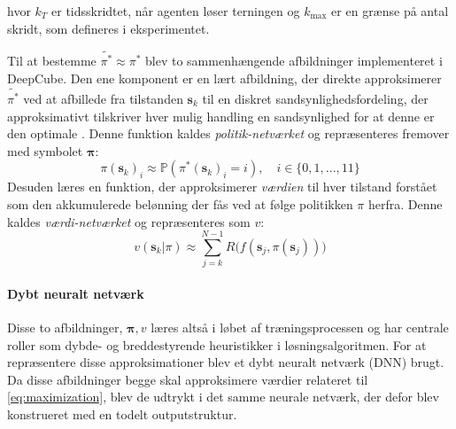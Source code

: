 \documentclass[../main.tex]{subfiles}
\begin{document}
hvor \(k_T\) er tidsskridtet, når agenten løser terningen og \(k_{\text{max}}\) er en grænse på antal skridt,  som defineres i eksperimentet. 

Til at bestemme \(\widetilde {\pi ^*} \approx 	\pi^*\) blev to sammenhængende afbildninger implementeret i DeepCube. Den ene komponent er en lært afbildning, der direkte approksimerer \(\widetilde {\pi ^*}\) ved at afbillede fra tilstanden \(\mathbf s_k\) til en diskret sandsynlighedsfordeling, der approksimativt tilskriver hver mulig handling en sandsynlighed for at denne er den optimale . Denne funktion kaldes \textit{politik-netværket} og repræsenteres fremover med symbolet \(\bm \pi\):
\[
\pi(\mathbf s_k)_i \approx \mathbb P (\pi^*(\mathbf s_k)_i = i ),\quad i \in \{0,1, ..., 11\}
\]
Desuden læres en funktion, der approksimerer \textit{værdien} til hver tilstand forstået som den akkumulerede belønning der fås ved at følge politikken \(\pi\) herfra. Denne kaldes \textit{værdi-netværket} og repræsenteres som \(v\):
\[
v(\mathbf s_k| \pi) \approx \sum_{j=k}^{N-1} R\big(f(\mathbf s_j,\pi(\mathbf s_j))\big)
\]
\paragraph{Dybt neuralt netværk} Disse to afbildninger, \(\bm \pi, v\) læres altså i løbet af træningsprocessen og har centrale roller som dybde- og breddestyrende heuristikker i  løsningsalgoritmen. For at repræsentere disse approksimationer blev et dybt neuralt netværk (DNN) brugt. Da disse afbildninger begge skal approksimere værdier relateret til  \eqref{eq:maximization}, blev de udtrykt i det samme neurale netværk, der defor blev konstrueret med en todelt outputstruktur. 
\end{document}
